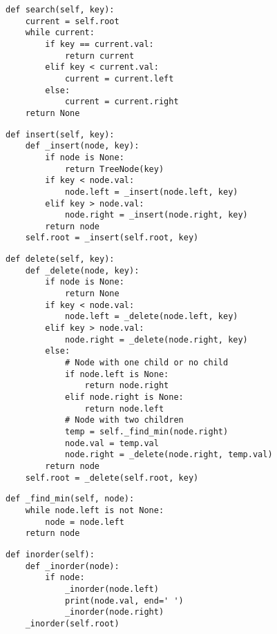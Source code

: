 \begin{algo}
\begin{lstlisting}
def search(self, key):
    current = self.root
    while current:
        if key == current.val:
            return current
        elif key < current.val:
            current = current.left
        else:
            current = current.right
    return None
\end{lstlisting}
\end{algo}

\begin{algo}
\begin{lstlisting}
def insert(self, key):
    def _insert(node, key):
        if node is None:
            return TreeNode(key)
        if key < node.val:
            node.left = _insert(node.left, key)
        elif key > node.val:
            node.right = _insert(node.right, key)
        return node
    self.root = _insert(self.root, key)
\end{lstlisting}
\end{algo}

\begin{algo}
\begin{lstlisting}
def delete(self, key):
    def _delete(node, key):
        if node is None:
            return None
        if key < node.val:
            node.left = _delete(node.left, key)
        elif key > node.val:
            node.right = _delete(node.right, key)
        else:
            # Node with one child or no child
            if node.left is None:
                return node.right
            elif node.right is None:
                return node.left
            # Node with two children
            temp = self._find_min(node.right)
            node.val = temp.val
            node.right = _delete(node.right, temp.val)
        return node
    self.root = _delete(self.root, key)
\end{lstlisting}
\end{algo}
    
\begin{algo}
\begin{lstlisting}
def _find_min(self, node):
    while node.left is not None:
        node = node.left
    return node
\end{lstlisting}
\end{algo}

\begin{algo}
\begin{lstlisting}
def inorder(self):
    def _inorder(node):
        if node:
            _inorder(node.left)
            print(node.val, end=' ')
            _inorder(node.right)
    _inorder(self.root)
\end{lstlisting}
\end{algo}    
\newpage

